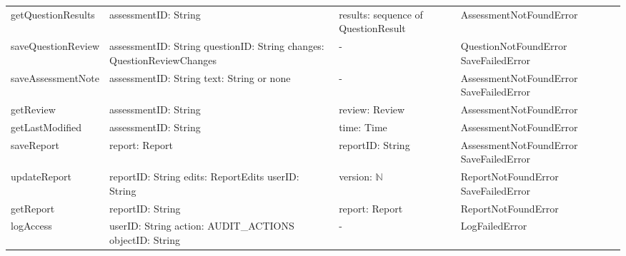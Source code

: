 \documentclass[12pt, titlepage]{article}
\begin{document}
{\begin{longtable}{>{\raggedright\arraybackslash}p{3.4cm} >{\raggedright\arraybackslash}p{4.3cm} >{\raggedright\arraybackslash}p{3.2cm} >{\raggedright\arraybackslash}p{4.3cm}}
getQuestionResults & assessmentID: String & results: sequence of QuestionResult & AssessmentNotFoundError \\[4pt]
saveQuestionReview & assessmentID: String \newline questionID: String \newline changes: QuestionReviewChanges & - & QuestionNotFoundError \newline SaveFailedError \\[4pt]
saveAssessmentNote & assessmentID: String \newline text: String or none & - & AssessmentNotFoundError \newline SaveFailedError \\[4pt]
getReview & assessmentID: String & review: Review & AssessmentNotFoundError \\[4pt]
getLastModified & assessmentID: String & time: Time & AssessmentNotFoundError \\[4pt]
saveReport & report: Report & reportID: String & AssessmentNotFoundError \newline SaveFailedError \\[4pt]
updateReport & reportID: String \newline edits: ReportEdits \newline userID: String & version: $\mathbb{N}$ & ReportNotFoundError \newline SaveFailedError \\[4pt]
getReport & reportID: String & report: Report & ReportNotFoundError \\[4pt]
logAccess & userID: String \newline action: AUDIT\_ACTIONS \newline objectID: String & - & LogFailedError \\[4pt]
\hline
\end{longtable}
}
\end{document}
